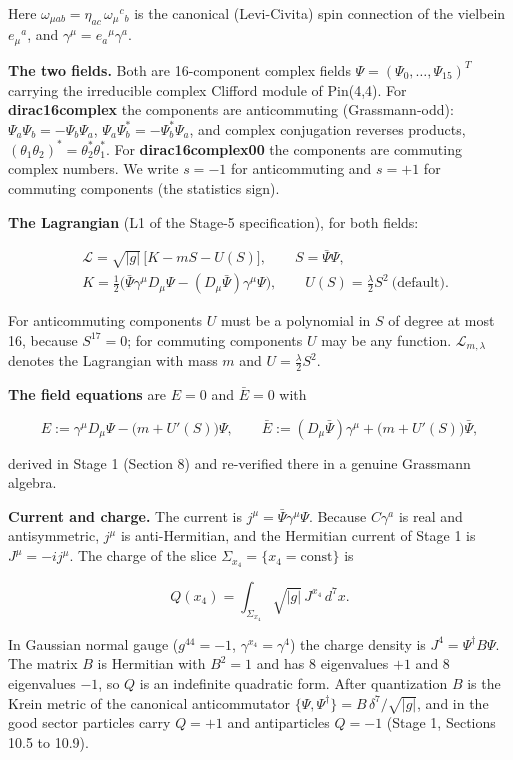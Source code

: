 \documentclass[11pt]{article}
\begin{document}
Here $\omega_{\mu ab}=\eta_{ac}\,\omega_\mu{}^c{}_b$ is the canonical (Levi-Civita) spin connection of the vielbein $e_\mu{}^a$, and $\gamma^\mu=e_a{}^\mu\gamma^a$.

\textbf{The two fields.} Both are 16-component complex fields $\Psi=(\Psi_0,\dots,\Psi_{15})^T$ carrying the irreducible complex Clifford module of Pin(4,4). For \textbf{dirac16complex} the components are anticommuting (Grassmann-odd): $\Psi_a\Psi_b=-\Psi_b\Psi_a$, $\Psi_a\Psi_b^\ast=-\Psi_b^\ast\Psi_a$, and complex conjugation reverses products, $(\theta_1\theta_2)^\ast=\theta_2^\ast\theta_1^\ast$. For \textbf{dirac16complex00} the components are commuting complex numbers. We write $s=-1$ for anticommuting and $s=+1$ for commuting components (the statistics sign).

\textbf{The Lagrangian} (L1 of the Stage-5 specification), for both fields:

\[
\begin{aligned}
&\mathcal L=\sqrt{|g|}\,\bigl[K-mS-U(S)\bigr],\qquad S=\bar\Psi\Psi,\\
&K=\tfrac12\bigl(\bar\Psi\gamma^\mu D_\mu\Psi-(D_\mu\bar\Psi)\gamma^\mu\Psi\bigr),\qquad U(S)=\tfrac\lambda2S^2\ \text{(default)}.
\end{aligned}
\]

For anticommuting components $U$ must be a polynomial in $S$ of degree at most 16, because $S^{17}=0$; for commuting components $U$ may be any function. $\mathcal L_{m,\lambda}$ denotes the Lagrangian with mass $m$ and $U=\tfrac\lambda2S^2$.

\textbf{The field equations} are $E=0$ and $\bar E=0$ with

\[
E:=\gamma^\mu D_\mu\Psi-\bigl(m+U'(S)\bigr)\Psi,\qquad \bar E:=(D_\mu\bar\Psi)\gamma^\mu+\bigl(m+U'(S)\bigr)\bar\Psi ,
\]

derived in Stage 1 (Section 8) and re-verified there in a genuine Grassmann algebra.

\textbf{Current and charge.} The current is $j^\mu=\bar\Psi\gamma^\mu\Psi$. Because $C\gamma^a$ is real and antisymmetric, $j^\mu$ is anti-Hermitian, and the Hermitian current of Stage 1 is $J^\mu=-ij^\mu$. The charge of the slice $\Sigma_{x_4}=\{x_4=\text{const}\}$ is

\[
Q(x_4)=\int_{\Sigma_{x_4}}\sqrt{|g|}\,J^{x_4}\,d^7x .
\]

In Gaussian normal gauge ($g^{44}=-1$, $\gamma^{x_4}=\gamma^4$) the charge density is $J^4=\Psi^\dagger B\Psi$. The matrix $B$ is Hermitian with $B^2=1$ and has 8 eigenvalues $+1$ and 8 eigenvalues $-1$, so $Q$ is an indefinite quadratic form. After quantization $B$ is the Krein metric of the canonical anticommutator $\{\Psi,\Psi^\dagger\}=B\,\delta^7/\sqrt{|g|}$, and in the good sector particles carry $Q=+1$ and antiparticles $Q=-1$ (Stage 1, Sections 10.5 to 10.9).
\end{document}
